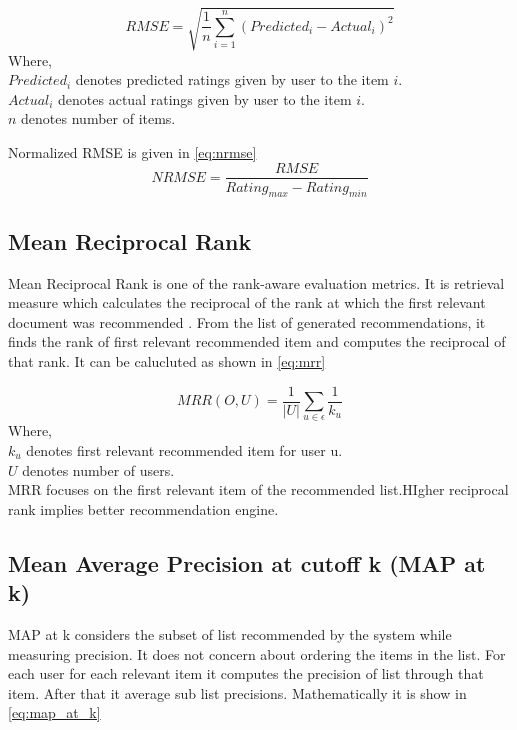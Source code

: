 \begin{equation}
RMSE = \sqrt{ \frac{1}{n} \sum_{i=1}^{n}{({Predicted_i - Actual_i} ) ^ {2}}}
\label{eq:rmse}
\end{equation}
Where, \\
$Predicted_i$ \textsf{ denotes predicted ratings given by user to the item} $i.$ \\
$Actual_i$ \textsf{ denotes actual ratings given by user to the item } $i.$ \\
$n$ \textsf{denotes number of items.}

\noindent Normalized RMSE is given in \autoref{eq:nrmse}
\begin{equation}
NRMSE = \frac{RMSE} {Rating_{max} - Rating_{min}}
\label{eq:nrmse}
\end{equation}



\subsection{Mean Reciprocal Rank}

Mean Reciprocal Rank is one of the rank-aware evaluation metrics.
It is retrieval measure which calculates the reciprocal of the rank at which the first relevant document was recommended \cite{27}.
From the list of generated recommendations, it finds the rank of first relevant recommended item and computes the reciprocal of that rank. It can be calucluted as shown in \autoref{eq:mrr}

\begin{equation}
MRR(O, U) = \frac{1}{\vert U \vert} \sum_{u \in \epsilon} \frac{1} {k_{u}}
\label{eq:mrr}
\end{equation}
\noindent Where, \\
$k_{u}$ denotes first relevant recommended item for user u. \\
$U$  denotes number of users. \\
MRR focuses on the first relevant item of the recommended list.HIgher reciprocal rank implies better recommendation engine.


\subsection{Mean Average Precision at cutoff k (MAP at k)}
MAP at k considers the subset of list recommended by the system while measuring precision. It does not concern about ordering the items in the list. For each user for each relevant item it computes the precision of list through that item. After that it average sub list precisions. Mathematically it is show in \autoref{eq:map_at_k}

